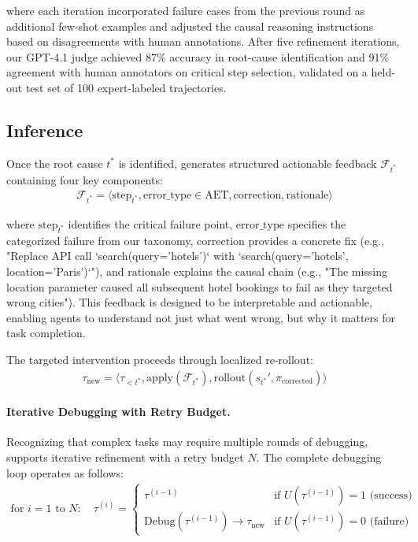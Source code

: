 where each iteration incorporated failure cases from the previous round as additional few-shot examples and adjusted the causal reasoning instructions based on disagreements with human annotations. After five refinement iterations, our GPT-4.1 judge achieved 87\% accuracy in root-cause identification and 91\% agreement with human annotators on critical step selection, validated on a held-out test set of 100 expert-labeled trajectories.


\subsection{Inference}

Once the root cause $t^*$ is identified, \ModelName{} generates structured actionable feedback $\mathcal{F}_{t^*}$ containing four key components:
\begin{align}
\mathcal{F}_{t^*} = \langle \text{step}_{t^*}, \text{error\_type} \in \text{AET}, \text{correction}, \text{rationale} \rangle
\end{align}

where $\text{step}_{t^*}$ identifies the critical failure point, $\text{error\_type}$ specifies the categorized failure from our taxonomy, $\text{correction}$ provides a concrete fix (e.g., "Replace API call `search(query='hotels')` with `search(query='hotels', location='Paris')`"), and $\text{rationale}$ explains the causal chain (e.g., "The missing location parameter caused all subsequent hotel bookings to fail as they targeted wrong cities"). This feedback is designed to be interpretable and actionable, enabling agents to understand not just what went wrong, but why it matters for task completion.

The targeted intervention proceeds through localized re-rollout:
\begin{align}
\tau_{\text{new}} = \langle \tau_{<t^*}, \text{apply}(\mathcal{F}_{t^*}), \text{rollout}(s_{t^*}', \pi_{\text{corrected}}) \rangle
\end{align}

\paragraph{Iterative Debugging with Retry Budget.}
Recognizing that complex tasks may require multiple rounds of debugging, \ModelName{} supports iterative refinement with a retry budget $N$. The complete debugging loop operates as follows:
\begin{align}
\text{for } i = 1 \text{ to } N: \quad \tau^{(i)} = \begin{cases}
\tau^{(i-1)} & \text{if } U(\tau^{(i-1)}) = 1 \text{ (success)} \\
\text{Debug}(\tau^{(i-1)}) \rightarrow \tau_{\text{new}} & \text{if } U(\tau^{(i-1)}) = 0 \text{ (failure)}
\end{cases}
\end{align}

